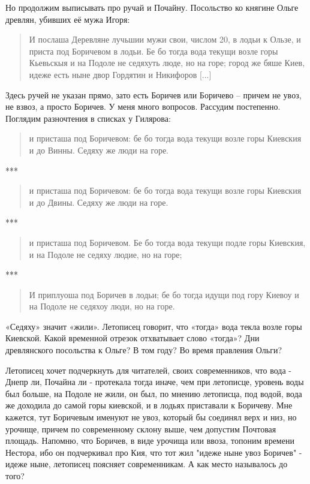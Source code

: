Но продолжим выписывать про ручай и Почайну. Посольство ко княгине Ольге древлян, убивших её мужа Игоря:

\begin{quotation}
И послаша Деревляне лучьшии мужи свои, числом 20, в лодьи к Ользе, и приста под Боричевом в лодьи. Бе бо тогда вода текущи возле горы Кьевьскыя и на Подоле не седяхуть люде, но на горе; город же бяше Киев, идеже есть ныне двор Гордятин и Никифоров [...]
\end{quotation}

Здесь ручей не указан прямо, зато есть Боричев или Боричево – причем не увоз, не взвоз, а просто Боричев. У меня много вопросов. Рассудим постепенно. Поглядим разночтения в списках у Гилярова:

\begin{quotation}
и присташа под Боричевом: бе бо тогда вода текущи возле горы Киевския и до Винны. Седяху же люди на горе.
\end{quotation}

\begin{center}***\end{center}

\begin{quotation}
и присташа под Боричевом: бе бо тогда вода текущи возле горы Киевския и до Двины. Седяху же люди на горе.
\end{quotation}

\begin{center}***\end{center}

\begin{quotation}
и присташа под Боричевом. Бе бо тогда вода текущи подле горы Киевския, и на Подоле не седяху людие, но на горе;
\end{quotation}

\begin{center}***\end{center}

\begin{quotation}
И приплуоша под Боричев в лодьи; бе бо тогда идущи под гору Киевоу и на Подоле не седяхоу люди, но на горе.
\end{quotation}

«Седяху» значит «жили». Летописец говорит, что «тогда» вода текла возле горы Киевской.
 Какой временной отрезок отхватывает слово «тогда»? Дни древлянского посольства к Ольге? В том году? Во время правления Ольги?

Летописец хочет подчеркнуть для читателей, своих современников, что вода - Днепр ли, Почайна ли - протекала тогда иначе,  чем при летописце, уровень воды был больше, на Подоле не жили, он был, по мнению летописца, под водой, вода же доходила до самой горы киевской, и в лодьях приставали к Боричеву. Мне кажется, тут Боричевым именуют не увоз, который бы соединял верх и низ, но урочище, причем по современному склону выше, чем допустим Почтовая площадь. Напомню, что Боричев, в виде урочища или ввоза, топоним времени Нестора, ибо он подчеркивал про Кия, что тот жил "идеже ныне увоз Боричев" - идеже ныне, летописец поясняет современникам. А как место называлось до того?

